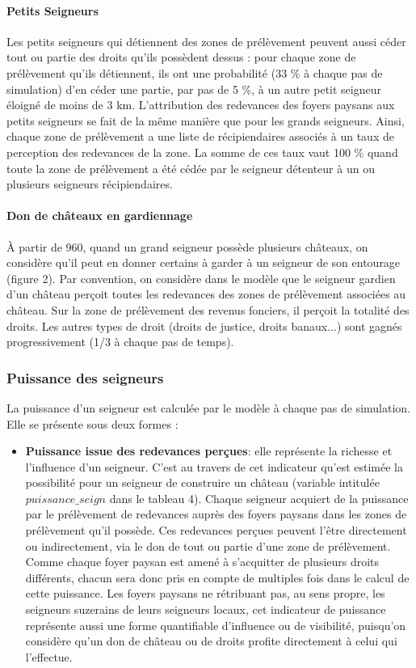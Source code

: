 {\paragraph{Petits Seigneurs}
Les petits seigneurs qui détiennent des zones de prélèvement peuvent aussi céder tout ou partie des droits qu'ils possèdent dessus :
pour chaque zone de prélèvement qu'ils détiennent, ils ont une probabilité (33 \% à chaque pas de simulation) d'en céder une partie, par pas de 5 \%, à un autre petit seigneur éloigné de moins de 3 km.
L'attribution des redevances des foyers paysans aux petits seigneurs se fait de la même manière que pour les grands seigneurs.
Ainsi, chaque zone de prélèvement a une liste de récipiendaires associés à un taux de perception des redevances de la zone.
La somme de ces taux vaut 100 \% quand toute la zone de prélèvement a été cédée par le seigneur détenteur à un ou plusieurs seigneurs récipiendaires.

\paragraph{Don de châteaux en gardiennage}
À partir de 960, quand un grand seigneur possède plusieurs châteaux, on considère qu'il peut en donner certains à garder à un seigneur de son entourage (figure 2).
Par convention, on considère dans le modèle que le seigneur gardien d'un château perçoit toutes les redevances des zones de prélèvement associées au
château.
Sur la zone de prélèvement des revenus fonciers, il perçoit la totalité des droits.
Les autres types de droit (droits de justice, droits banaux...) sont gagnés progressivement (1/3 à chaque pas de temps).

\subsubsection{Puissance des seigneurs}

La puissance d'un seigneur est calculée par le modèle à chaque pas de simulation.
Elle se présente sous deux formes :
\begin{itemize}
\item \textbf{Puissance issue des redevances perçues}: elle représente la richesse et l'influence d'un seigneur.
C'est au travers de cet indicateur qu'est estimée la possibilité pour un seigneur de construire un château (variable intitulée $puissance\_seign$ dans le tableau 4).
Chaque seigneur acquiert de la puissance par le prélèvement de redevances auprès des foyers paysans dans les zones de prélèvement qu'il possède.
Ces redevances perçues peuvent l'être directement ou indirectement, via le don de tout ou partie d'une zone de prélèvement.
Comme chaque foyer paysan est amené à s'acquitter de plusieurs droits différents, chacun sera donc pris en compte de multiples fois dans le calcul de cette puissance.
Les foyers paysans ne rétribuant pas, au sens propre, les seigneurs suzerains de leurs seigneurs locaux, cet indicateur de puissance représente aussi une forme quantifiable d'influence ou de visibilité, puisqu'on considère qu'un don de château ou de droits profite directement à celui qui l'effectue.


\end{itemize}}
